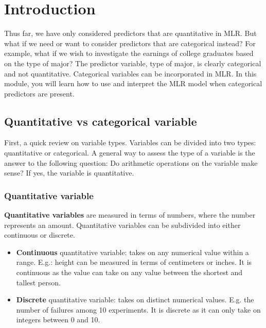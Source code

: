 \documentclass[
]{book}
\providecommand{\tightlist}{%
  \setlength{\itemsep}{0pt}\setlength{\parskip}{0pt}}
\begin{document}
\hypertarget{introduction-7}{%
\section{Introduction}\label{introduction-7}}

Thus far, we have only considered predictors that are quantitative in MLR. But what if we need or want to consider predictors that are categorical instead? For example, what if we wish to investigate the earnings of college graduates based on the type of major? The predictor variable, type of major, is clearly categorical and not quantitative. Categorical variables can be incorporated in MLR. In this module, you will learn how to use and interpret the MLR model when categorical predictors are present.

\hypertarget{quantitative-vs-categorical-variable}{%
\subsection{Quantitative vs categorical variable}\label{quantitative-vs-categorical-variable}}

First, a quick review on variable types. Variables can be divided into two types: quantitative or categorical. A general way to assess the type of a variable is the answer to the following question: Do arithmetic operations on the variable make sense? If yes, the variable is quantitative.

\hypertarget{quantitative-variable}{%
\subsubsection{Quantitative variable}\label{quantitative-variable}}

\textbf{Quantitative variables} are measured in terms of numbers, where the number represents an amount. Quantitative variables can be subdivided into either continuous or discrete.

\begin{itemize}
\tightlist
\item
  \textbf{Continuous} quantitative variable: takes on any numerical value within a range. E.g.: height can be measured in terms of centimeters or inches. It is continuous as the value can take on any value between the shortest and tallest person.
\item
  \textbf{Discrete} quantitative variable: takes on distinct numerical values. E.g. the number of failures among 10 experiments. It is discrete as it can only take on integers between 0 and 10.
\end{itemize}
\end{document}

